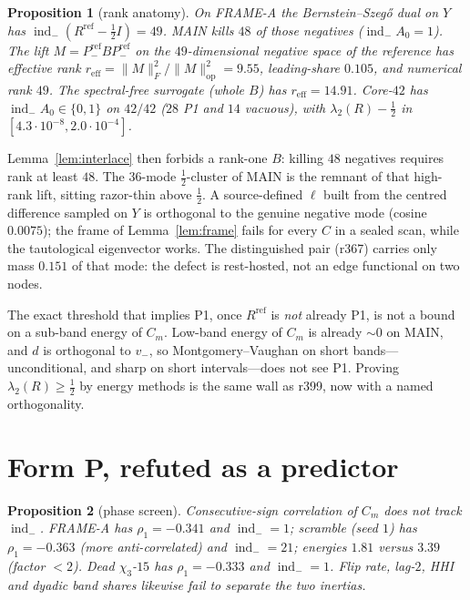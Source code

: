 \documentclass[11pt]{article}
\newtheorem{prop}{Proposition}
\theoremstyle{remark}
\newcommand{\indm}{\operatorname{ind}_{-}}
\newcommand{\half}{\tfrac12}
\begin{document}
\begin{prop}[rank anatomy]\label{prop:rank}
On FRAME-A the Bernstein--Szeg\H{o} dual on $Y$ has
$\indm(R^{\mathrm{ref}}-\half I)=49$.
MAIN kills $48$ of those negatives ($\indm A_0=1$).
The lift $M=P^{\mathrm{ref}}_- B P^{\mathrm{ref}}_-$ on the
$49$-dimensional negative space of the reference has
effective rank $r_{\mathrm{eff}}=\|M\|_F^2/\|M\|_{\mathrm{op}}^2=9.55$,
leading-share $0.105$, and numerical rank $49$.
The spectral-free surrogate (whole $B$) has $r_{\mathrm{eff}}=14.91$.
Core-$42$ has $\indm A_0\in\{0,1\}$ on $42/42$ ($28$ P1 and
$14$ vacuous), with $\lambda_2(R)-\half$ in
$[4.3\cdot 10^{-8},2.0\cdot 10^{-4}]$.
\end{prop}

Lemma~\ref{lem:interlace} then forbids a rank-one $B$:
killing $48$ negatives requires rank at least $48$.
The $36$-mode $\half$-cluster of MAIN is the remnant of that
high-rank lift, sitting razor-thin above $\half$.
A source-defined $\ell$ built from the centred difference
sampled on $Y$ is orthogonal to the genuine negative mode
(cosine $0.0075$); the frame of Lemma~\ref{lem:frame} fails
for every $C$ in a sealed scan, while the tautological
eigenvector works.
The distinguished pair (r367) carries only mass $0.151$ of
that mode: the defect is rest-hosted, not an edge functional
on two nodes.

The exact threshold that implies P1, once
$R^{\mathrm{ref}}$ is \emph{not} already P1, is not a bound
on a sub-band energy of $C_m$.
Low-band energy of $C_m$ is already $\sim 0$ on MAIN, and
$d$ is orthogonal to $v_-$, so Montgomery--Vaughan on short
bands---unconditional, and sharp on short intervals---does
not see P1.
Proving $\lambda_2(R)\ge\half$ by energy methods is the same
wall as r399, now with a named orthogonality.

\section{Form P, refuted as a predictor}\label{sec:P}

\begin{prop}[phase screen]\label{prop:phase}
Consecutive-sign correlation of $C_m$ does not track
$\indm$.
FRAME-A has $\rho_1=-0.341$ and $\indm=1$; scramble
(seed $1$) has $\rho_1=-0.363$ (more anti-correlated) and
$\indm=21$; energies $1.81$ versus $3.39$ (factor $<2$).
Dead $\chi_3$-$15$ has $\rho_1=-0.333$ and $\indm=1$.
Flip rate, lag-$2$, HHI and dyadic band shares likewise
fail to separate the two inertias.
\end{prop}
\end{document}
